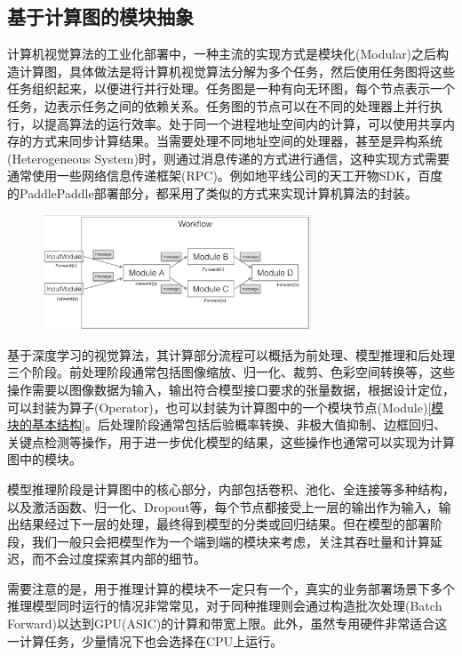 \documentclass[master]{shtthesis}
\begin{document}
\subsection{基于计算图的模块抽象}\label{基于计算图的模块抽象}
计算机视觉算法的工业化部署中，一种主流的实现方式是模块化(Modular)之后构造计算图，具体做法是将计算机视觉算法分解为多个任务\cite{arora1998thread}，然后使用任务图将这些任务组织起来，以便进行并行处理。任务图是一种有向无环图，每个节点表示一个任务，边表示任务之间的依赖关系。任务图的节点可以在不同的处理器上并行执行，以提高算法的运行效率。处于同一个进程地址空间内的计算，可以使用共享内存的方式来同步计算结果\cite{augonnet2009starpu}。当需要处理不同地址空间的处理器，甚至是异构系统(Heterogeneous System)时，则通过消息传递的方式进行通信，这种实现方式需要通常使用一些网络信息传递框架(RPC)。例如地平线公司的天工开物SDK，百度的PaddlePaddle\cite{ma2019paddlepaddle}部署部分，都采用了类似的方式来实现计算机算法的封装。

\begin{figure}[htbp]
	\centering
	\includegraphics[width=8cm]{img/workflow.png}
	\label{基于模块构造工作流}
\end{figure}

基于深度学习的视觉算法，其计算部分流程可以概括为前处理、模型推理和后处理三个阶段。前处理阶段通常包括图像缩放、归一化、裁剪、色彩空间转换等，这些操作需要以图像数据为输入，输出符合模型接口要求的张量数据，根据设计定位，可以封装为算子(Operator)，也可以封装为计算图中的一个模块节点(Module)\ref{模块的基本结构}。后处理阶段通常包括后验概率转换、非极大值抑制、边框回归、关键点检测等操作，用于进一步优化模型的结果，这些操作也通常可以实现为计算图中的模块。

模型推理阶段是计算图中的核心部分，内部包括卷积、池化、全连接等多种结构，以及激活函数、归一化、Dropout\cite{srivastava2014dropout}等，每个节点都接受上一层的输出作为输入，输出结果经过下一层的处理，最终得到模型的分类或回归结果。但在模型的部署阶段，我们一般只会把模型作为一个端到端的模块来考虑，关注其吞吐量和计算延迟，而不会过度探索其内部的细节。

需要注意的是，用于推理计算的模块不一定只有一个，真实的业务部署场景下多个推理模型同时运行的情况非常常见，对于同种推理则会通过构造批次处理(Batch Forward)\cite{mcclelland1987parallel}以达到GPU(ASIC)的计算和带宽上限。此外，虽然专用硬件非常适合这一计算任务，少量情况下也会选择在CPU上运行。
\end{document}
